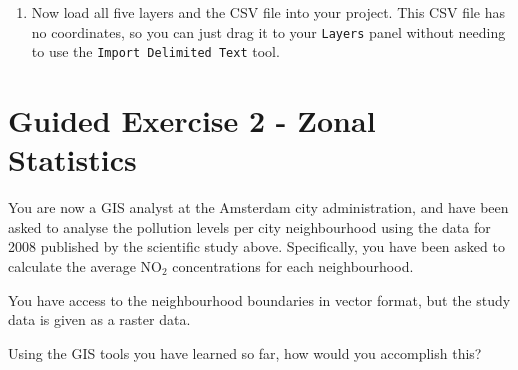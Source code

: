 \documentclass[
  letterpaper,
  DIV=11,
  numbers=noendperiod]{scrreprt}
\providecommand{\tightlist}{%
  \setlength{\itemsep}{0pt}\setlength{\parskip}{0pt}}\usepackage{longtable,booktabs,array}
\begin{document}
\begin{enumerate}
\def\labelenumi{(\arabic{enumi})}
\setcounter{enumi}{324}
\tightlist
\item
  Now load all five layers and the CSV file into your project. This CSV
  file has no coordinates, so you can just drag it to your
  \texttt{Layers} panel without needing to use the
  \texttt{Import\ Delimited\ Text} tool.
\end{enumerate}

\section{Guided Exercise 2 - Zonal
Statistics}\label{guided-exercise-2---zonal-statistics}

You are now a GIS analyst at the Amsterdam city administration, and have
been asked to analyse the pollution levels per city neighbourhood using
the data for 2008 published by the scientific study above. Specifically,
you have been asked to calculate the average NO\(_2\) concentrations for
each neighbourhood.

You have access to the neighbourhood boundaries in vector format, but
the study data is given as a raster data.

\begin{tcolorbox}[enhanced jigsaw, breakable, toptitle=1mm, colback=white, left=2mm, leftrule=.75mm, titlerule=0mm, colframe=quarto-callout-important-color-frame, opacityback=0, title=\textcolor{quarto-callout-important-color}{\faExclamation}\hspace{0.5em}{Stop and Think}, toprule=.15mm, opacitybacktitle=0.6, bottomtitle=1mm, colbacktitle=quarto-callout-important-color!10!white, bottomrule=.15mm, coltitle=black, rightrule=.15mm, arc=.35mm]

Using the GIS tools you have learned so far, how would you accomplish
this?

\end{tcolorbox}
\end{document}
